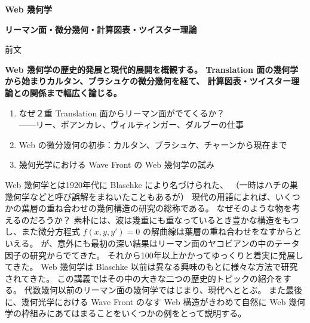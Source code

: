 \documentclass[uplatex,dvipdfmx]{jlreq}
\begin{document}
\begin{center}
  \vspace*{20pt}
  {\Huge\bfseries Web 幾何学}

  \vspace{30pt}

  {\Large\bfseries リーマン面・微分幾何・計算図表・ツイスター理論}

  \vspace{50pt}

  {\large 前文}

  \vspace{10pt}

  \parbox{0.85\textwidth}{
    \large\bfseries
    Web 幾何学の歴史的発展と現代的展開を概観する。
    Translation 面の幾何学から始まりカルタン、ブラシュケの微分幾何を経て、
    計算図表・ツイスター理論との関係まで幅広く論じる。
  }
\end{center}

\vfill

\newpage

\begin{center}
{\large
\begin{enumerate}
  \setlength{\itemsep}{2pt}
  \item なぜ２重 Translation 面からリーマン面がでてくるか？\\
        \hspace*{\fill}——リー、ポアンカレ、ヴィルティンガー、ダルブーの仕事
  \item Web の微分幾何の初歩：カルタン、ブラシュケ、チャーンから現在まで
  \item 幾何光学における Wave Front の Web 幾何学の試み
\end{enumerate}
}

\hspace*{\fill}{\large\bfseries 中居 功（北海道大学・数学教室）}
\end{center}

\bigskip

Web 幾何学とは1920年代に Blaschke により名づけられた、
（一時はハチの巣幾何学などと呼び誤解をまねいたこともあるが）
現代の用語によれば、いくつかの葉層の重ね合わせの幾何構造の研究の総称である。
なぜそのような物を考えるのだろうか？
素朴には、波は幾重にも重なっているとき豊かな構造をもつし、また微分方程式
$f(x,y,y')=0$ の解曲線は葉層の重ね合わせをなすからといえる。
が、意外にも最初の深い結果はリーマン面のヤコビアンの中のテータ因子の研究からでてきた。
それから100年以上かかってゆっくりと着実に発展してきた。
Web 幾何学は Blaschke 以前は異なる興味のもとに様々な方法で研究されてきた。
この講義ではその中の大きな二つの歴史的トピックの紹介をする。
代数幾何以前のリーマン面の幾何学ではじまり、現代へととぶ。
また最後に、幾何光学における Wave Front のなす Web 構造がきわめて自然に
Web 幾何学の枠組みにあてはまることをいくつかの例をとって説明する。
\end{document}
